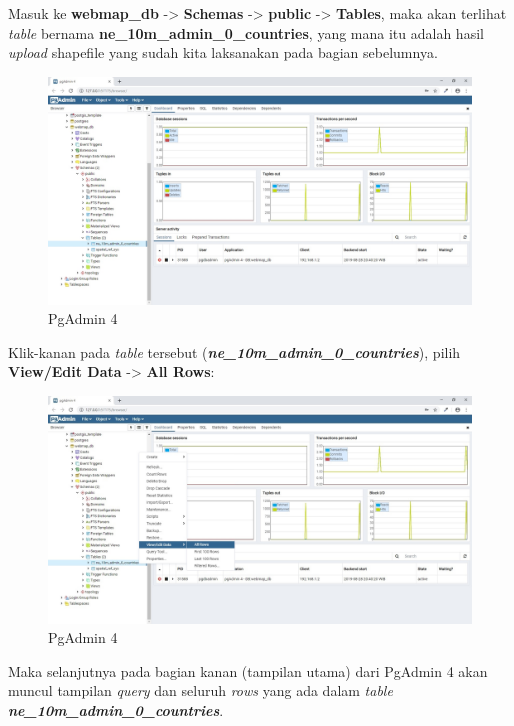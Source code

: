\documentclass[]{book}
\begin{document}
Masuk ke \textbf{webmap\_db} -\textgreater{} \textbf{Schemas} -\textgreater{} \textbf{public} -\textgreater{} \textbf{Tables}, maka akan terlihat \emph{table} bernama \textbf{ne\_10m\_admin\_0\_countries}, yang mana itu adalah hasil \emph{upload} shapefile yang sudah kita laksanakan pada bagian sebelumnya.

\begin{figure}
\centering
\includegraphics{./img/pgadmin4-show-tables.jpg}
\caption{PgAdmin 4}
\end{figure}

Klik-kanan pada \emph{table} tersebut (\textbf{\emph{ne\_10m\_admin\_0\_countries}}), pilih \textbf{View/Edit Data} -\textgreater{} \textbf{All Rows}:

\begin{figure}
\centering
\includegraphics{./img/pgadmin4-right-click-on-table.jpg}
\caption{PgAdmin 4}
\end{figure}

Maka selanjutnya pada bagian kanan (tampilan utama) dari PgAdmin 4 akan muncul tampilan \emph{query} dan seluruh \emph{rows} yang ada dalam \emph{table} \textbf{\emph{ne\_10m\_admin\_0\_countries}}.
\end{document}
